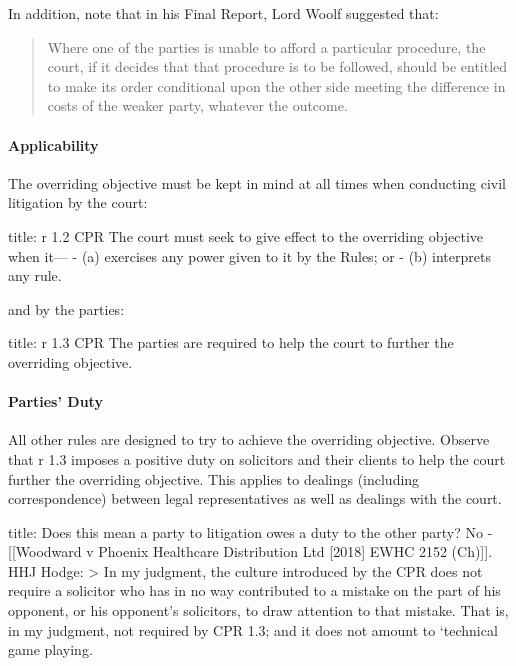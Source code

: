 \documentclass[
]{article}
\newenvironment{Shaded}{}{}
\newcommand{\NormalTok}[1]{#1}
\begin{document}
In addition, note that in his Final Report, Lord Woolf suggested that:

\begin{quote}
Where one of the parties is unable to afford a particular procedure, the
court, if it decides that that procedure is to be followed, should be
entitled to make its order conditional upon the other side meeting the
difference in costs of the weaker party, whatever the outcome.
\end{quote}

\hypertarget{applicability}{%
\paragraph{Applicability}\label{applicability}}

The overriding objective must be kept in mind at all times when
conducting civil litigation by the court:

\begin{Shaded}
\begin{Highlighting}[]
\NormalTok{title: r 1.2 CPR}
\NormalTok{The court must seek to give effect to the overriding objective when it—}
\NormalTok{{-} (a) exercises any power given to it by the Rules; or}
\NormalTok{{-} (b) interprets any rule.}
\end{Highlighting}
\end{Shaded}

and by the parties:

\begin{Shaded}
\begin{Highlighting}[]
\NormalTok{title: r 1.3 CPR}
\NormalTok{The parties are required to help the court to further the overriding objective. }
\end{Highlighting}
\end{Shaded}

\hypertarget{parties-duty}{%
\paragraph{Parties' Duty}\label{parties-duty}}

All other rules are designed to try to achieve the overriding objective.
Observe that r 1.3 imposes a positive duty on solicitors and their
clients to help the court further the overriding objective. This applies
to dealings (including correspondence) between legal representatives as
well as dealings with the court.

\begin{Shaded}
\begin{Highlighting}[]
\NormalTok{title: Does this mean a party to litigation owes a duty to the other party?}
\NormalTok{No {-} [[Woodward v Phoenix Healthcare Distribution Ltd [2018] EWHC 2152 (Ch)]]. HHJ Hodge: }
\NormalTok{\textgreater{} In my judgment, the culture introduced by the CPR does not require a solicitor who has in no way contributed to a mistake on the part of his opponent, or his opponent’s solicitors, to draw attention to that mistake. That is, in my judgment, not required by CPR 1.3; and it does not amount to ‘technical game playing\textquotesingle{}.}
\end{Highlighting}
\end{Shaded}
\end{document}
